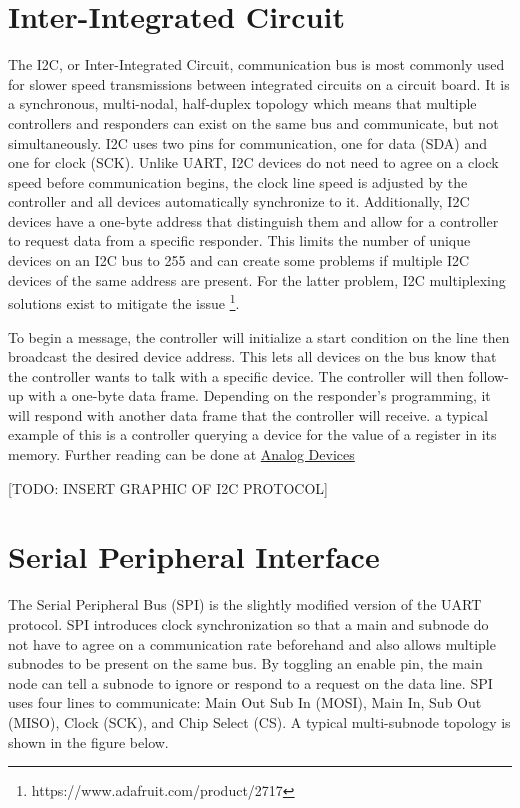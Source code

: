 \section[I2C Explained]{Inter-Integrated Circuit} \label{sec:i2c}
The I2C, or Inter-Integrated Circuit, communication bus is most commonly used for slower speed transmissions between integrated circuits on a circuit board.
It is a synchronous, multi-nodal, half-duplex topology which means that multiple controllers and responders can exist on the same bus and communicate, but not simultaneously.
I2C uses two pins for communication, one for data (SDA) and one for clock (SCK).
Unlike UART, I2C devices do not need to agree on a clock speed before communication begins, the clock line speed is adjusted by the controller and all devices automatically synchronize to it.
Additionally, I2C devices have a one-byte address that distinguish them and allow for a controller to request data from a specific responder.
This limits the number of unique devices on an I2C bus to 255 and can create some problems if multiple I2C devices of the same address are present.
For the latter problem, I2C multiplexing solutions exist to mitigate the issue \footnote[3]{https://www.adafruit.com/product/2717}.

To begin a message, the controller will initialize a start condition on the line then broadcast the desired device address.
This lets all devices on the bus know that the controller wants to talk with a specific device.
The controller will then follow-up with a one-byte data frame.
Depending on the responder's programming, it will respond with another data frame that the controller will receive.
a typical example of this is a controller querying a device for the value of a register in its memory.
Further reading can be done at \href{https://www.analog.com/en/technical-articles/i2c-primer-what-is-i2c-part-1.html}{Analog Devices}

[TODO: INSERT GRAPHIC OF I2C PROTOCOL]

\section[SPI Explained]{Serial Peripheral Interface} \label{sec:spi}
The Serial Peripheral Bus (SPI) is the slightly modified version of the UART protocol.
SPI introduces clock synchronization so that a main and subnode do not have to agree on a communication rate beforehand and also allows multiple subnodes to be present on the same bus.
By toggling an enable pin, the main node can tell a subnode to ignore or respond to a request on the data line.
SPI uses four lines to communicate: Main Out Sub In (MOSI), Main In, Sub Out (MISO), Clock (SCK), and Chip Select (CS).
A typical multi-subnode topology is shown in the figure below.

